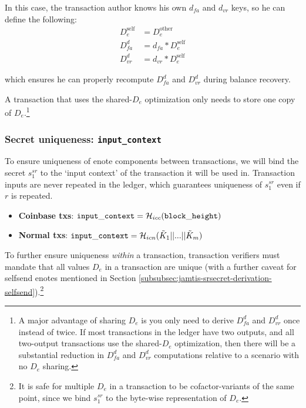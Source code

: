 In this case, the transaction author knows his own $d_{fa}$ and $d_{vr}$ keys, so he can define the following:\vspace{.115cm}
\begin{align*}
    D^{\textrm{self}}_e &= D^{\textrm{other}}_e \\
    D^d_{fa}            &= d_{fa} * D^{\textrm{self}}_e \\
    D^d_{vr}            &= d_{vr} * D^{\textrm{self}}_e
\end{align*}

which ensures he can properly recompute $D^d_{fa}$ and $D^d_{vr}$ during balance recovery.

A transaction that uses the shared-$D_e$ optimization only needs to store one copy of $D_e$.\footnote{A major advantage of sharing $D_e$ is you only need to derive $D^d_{fa}$ and $D^d_{vr}$ once instead of twice. If most transactions in the ledger have two outputs, and all two-output transactions use the shared-$D_e$ optimization, then there will be a substantial reduction in $D^d_{fa}$ and $D^d_{vr}$ computations relative to a scenario with no $D_e$ sharing.}

\subsubsection{Secret uniqueness: {\tt input\_context}}
\label{subsubsec:jamtis-srsecret-secret-uniqueness}

To ensure uniqueness of enote components between transactions, we will bind the secret $s^{sr}_1$ to the `input context' of the transaction it will be used in. Transaction inputs are never repeated in the ledger, which guarantees uniqueness of $s^{sr}_1$ even if $r$ is repeated.

\begin{itemize}
    \item \textbf{Coinbase txs}: ${\tt input\_context} = \mathcal{H}_{icc}({\tt block\_height})$
    \item \textbf{Normal txs}: ${\tt input\_context} = \mathcal{H}_{icn}(\tilde{K}_1 || ... || \tilde{K}_m)$
\end{itemize}

To further ensure uniqueness {\em within} a transaction, transaction verifiers must mandate that all values $D_e$ in a transaction are unique (with a further caveat for selfsend enotes mentioned in Section \ref{subsubsec:jamtis-srsecret-derivation-selfsend}).\footnote{It is safe for multiple $D_e$ in a transaction to be cofactor-variants of the same point, since we bind $s^{sr}_1$ to the byte-wise representation of $D_e$.}

